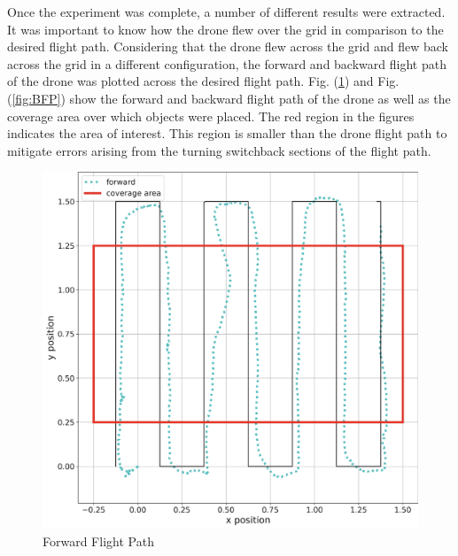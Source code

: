 Once the experiment was complete, a number of different results were extracted. It was important to know how the drone flew over the grid in comparison to the desired flight path. Considering that the drone flew across the grid and flew back across the grid in a different configuration, the forward and backward flight path of the drone was plotted across the desired flight path. Fig. (\ref{fig:FFP}) and Fig. (\ref{fig:BFP}) show the forward and backward flight path of the drone as well as the coverage area over which objects were placed. The red region in the figures indicates the area of interest. This region is smaller than the drone flight path to mitigate errors arising from the turning switchback sections of the flight path.
\begin{figure}[H]
  \centering
  \includegraphics[width=0.7\linewidth, height=0.7\linewidth]{R&D/FFP.png}  
  \caption{Forward Flight Path}
  \label{fig:FFP}
\end{figure}

